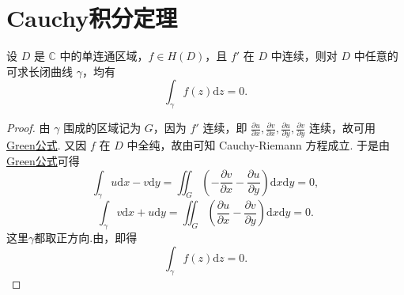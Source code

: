 \documentclass[../../main.tex]{subfiles}%
\begin{document}
\section{Cauchy积分定理}

\begin{theorem}[Cauchy定理]\label{theorem:Cauchy定理}
设 \( D \) 是 \( \mathbb{C} \) 中的单连通区域，\( f \in H(D) \)，且 \( f' \) 在 \( D \) 中连续，则对 \( D \) 中任意的可求长闭曲线 \( \gamma \)，均有
\[
\int_\gamma f(z)\mathrm{d}z = 0.
\]
\end{theorem}
\begin{proof}  
由 \( \gamma \) 围成的区域记为 \( G \)，因为 \( f' \) 连续，即 \( \frac{\partial u}{\partial x}, \frac{\partial v}{\partial x}, \frac{\partial u}{\partial y}, \frac{\partial v}{\partial y} \) 连续，故可用 \hyperref[Basis Analytics-theorem:Green公式--数分]{Green公式}. 又因 \( f \) 在 \( D \) 中全纯，故由可知 Cauchy-Riemann 方程成立. 于是由\hyperref[Basis Analytics-theorem:Green公式--数分]{Green公式}可得
\[
\int_\gamma u \mathrm{d}x - v \mathrm{d}y = \iint_G \left( -\frac{\partial v}{\partial x} - \frac{\partial u}{\partial y} \right) \mathrm{d}x\mathrm{d}y = 0,
\]
\[
\int_\gamma v \mathrm{d}x + u \mathrm{d}y = \iint_G \left( \frac{\partial u}{\partial x} - \frac{\partial v}{\partial y} \right) \mathrm{d}x\mathrm{d}y = 0.
\]
这里$\gamma$都取正方向.由，即得
\[
\int_\gamma f(z)\mathrm{d}z = 0.
\]
\end{proof}
\end{document}
